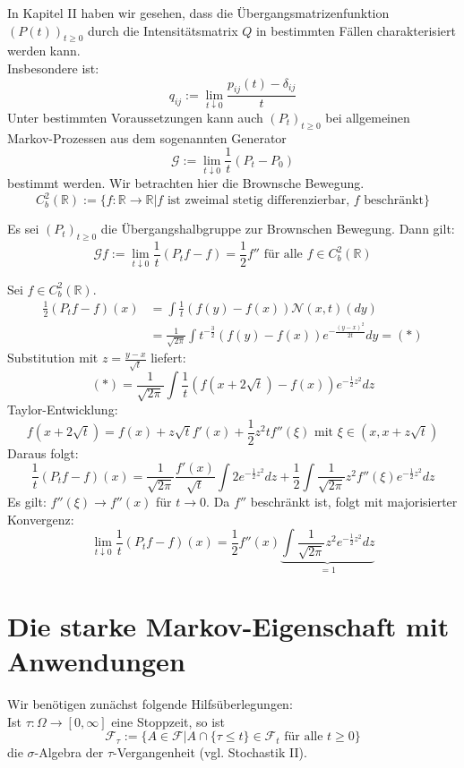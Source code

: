 \documentclass[a4paper,twoside,DIV15,BCOR12mm]{scrbook}
\newcommand{\cF}{\mathcal F}
\begin{document}
In Kapitel II haben wir gesehen, dass die Übergangsmatrizenfunktion $(P(t))_{t\geq0}$ durch die Intensitätsmatrix $Q$ in bestimmten Fällen charakterisiert werden kann. \\
Insbesondere ist:
\[
q_{ij}:=\lim_{t\downarrow0}\frac{p_{ij}(t)-\delta_{ij}}{t}
\]
Unter bestimmten Voraussetzungen kann auch $(P_t)_{t\geq0}$ bei allgemeinen Markov-Prozessen aus dem sogenannten Generator
\[
\mathcal G:=\lim_{t\downarrow0}\frac{1}{t}(P_t-P_0)
\]
bestimmt werden. Wir betrachten hier die Brownsche Bewegung.
\[
C_b^2(\mathbb R):=\{f:\mathbb R\to\mathbb R\vert f \text{ ist zweimal stetig differenzierbar, $f$ beschränkt}\}
\]
\begin{satz}
\label{satz:12.2}
  Es sei $(P_t)_{t\geq0}$ die Übergangshalbgruppe zur Brownschen Bewegung. Dann gilt:
\[
\mathcal Gf:=\lim_{t\downarrow0}\frac{1}{t}(P_tf-f)=\frac{1}{2}f''\text{ für alle }f\in C_b^2(\mathbb R)
\]
\end{satz}
\begin{beweis}
  Sei $f\in C_b^2(\mathbb R)$.
  \begin{align*}
    \frac{1}{2}(P_tf-f)(x)&=\int\frac{1}{t}(f(y)-f(x))\mathcal N(x,t)(dy) \\
&=\frac{1}{\sqrt{2\pi}}\int t^{-\frac{3}{2}}(f(y)-f(x))e^{-\frac{(y-x)^2}{2t}}dy =(*)
  \end{align*}
Substitution mit $z=\frac{y-x}{\sqrt{t}}$ liefert:
\[
(*)=\frac{1}{\sqrt{2\pi}}\int\frac{1}{t}(f(x+2\sqrt{t})-f(x))e^{-\frac{1}{2}z^2}dz
\]
Taylor-Entwicklung:
\[
f(x+2\sqrt{t})=f(x)+z\sqrt{t}f'(x)+\frac{1}{2} z^2tf''(\xi)\text{ mit }\xi\in(x,x+z\sqrt{t})
\]
Daraus folgt:
\[
\frac{1}{t}(P_tf-f)(x)=\frac{1}{\sqrt{2\pi}}\frac{f'(x)}{\sqrt{t}}\int2e^{-\frac{1}{2}z^2}dz+\frac{1}{2}\int\frac{1}{\sqrt{2\pi}}z^2f''(\xi)e^{-\frac{1}{2}z^2}dz
\]
Es gilt: $f''(\xi)\to f''(x)$ für $t\to0$. Da $f''$ beschränkt ist, folgt mit majorisierter Konvergenz:
\[
\lim_{t\downarrow0}\frac{1}{t}(P_tf-f)(x)=\frac{1}{2}f''(x)\underbrace{\int\frac{1}{\sqrt{2\pi}}z^2e^{-\frac{1}{2}z^2}dz}_{=1}
\]
\end{beweis}
\section{Die starke Markov-Eigenschaft mit Anwendungen}
Wir benötigen zunächst folgende Hilfsüberlegungen: \\
Ist $\tau:\Omega\longrightarrow[0,\infty]$ eine Stoppzeit, so ist
\[
\cF_\tau:=\{A\in\cF\vert A\cap\{\tau\leq t\}\in\cF_t\text{ für alle } t\geq0\}
\]
die $\sigma$-Algebra der $\tau$-Vergangenheit (vgl. Stochastik II).
\end{document}
